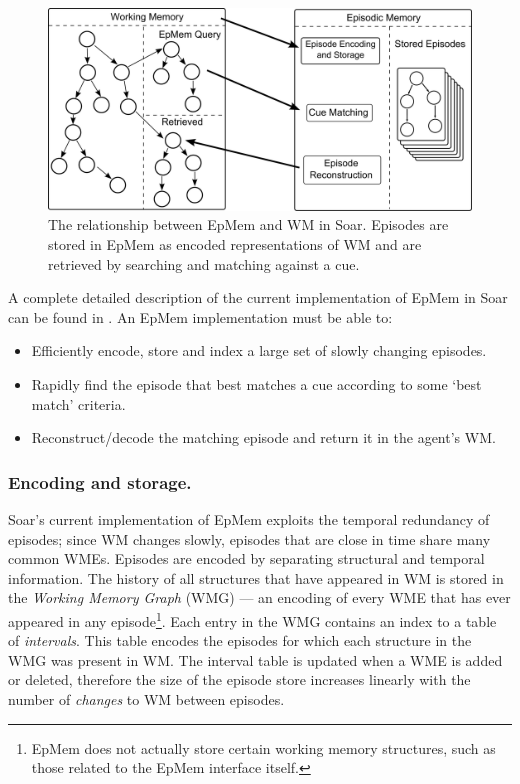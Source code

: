 \documentclass[envcountsame]{llncs}
\begin{document}
  \begin{figure}
  \centering
  \includegraphics[scale=0.15]{graphics/epmem_diagram.pdf}
  \caption{The relationship between EpMem and WM in Soar.
  Episodes are stored in EpMem as encoded representations of WM and are retrieved by searching and matching against a cue.}
  \label{fig:epmem_diagram}
  \end{figure}

  A complete detailed description of the current implementation of EpMem in Soar can be found in
  \cite{derbinsky2012effective}.
  An EpMem implementation must be able to:
  \begin{itemize}
  \item Efficiently encode, store and index a large set of slowly changing episodes.
  \item Rapidly find the episode that best matches a cue according to some `best match' criteria.
  \item Reconstruct/decode the matching episode and return it in the agent's WM.
  \end{itemize}
  
  \subsubsection{Encoding and storage.}
  Soar's current implementation of EpMem exploits the temporal redundancy of episodes; since WM changes slowly, episodes that are close in time share many common WMEs.
  Episodes are encoded by separating structural and temporal information.
  The history of all structures that have appeared in WM is stored in the \emph{Working Memory Graph} (WMG) --- an encoding of every WME that has ever appeared in any episode\footnote{EpMem does not actually store certain working memory structures, such as those related to the EpMem interface itself.}.
  Each entry in the WMG contains an index to a table of \emph{intervals}.
  This table encodes the episodes for which each structure in the WMG was present in WM.
  The interval table is updated when a WME is added or deleted, therefore the size of the episode store increases linearly with the number of \emph{changes} to WM between episodes.
  
\end{document}
